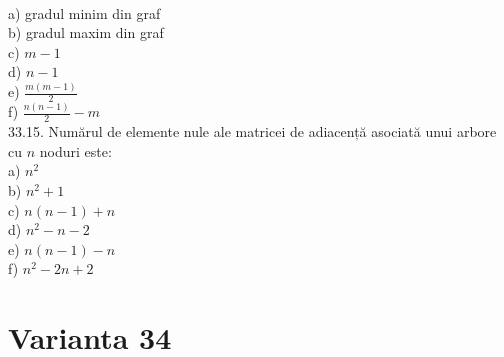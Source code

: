 \begin{itemize}
\begin{enumerate}
\\
a) gradul minim din graf
\\
b) gradul maxim din graf
\\
c) $m-1$
\\
d) $n-1$
\\
e) $\frac{m(m-1)}{2}$
\\
f) $\frac{n(n-1)}{2}-m$
\\
33.15. Numărul de elemente nule ale matricei de adiacență asociată unui arbore cu $n$ noduri este:\\
a) $n^{2}$
\\
b) $n^{2}+1$
\\
c) $n(n-1)+n$
\\
d) $n^{2}-n-2$
\\
e) $n(n-1)-n$
\\
f) $n^{2}-2 n+2$
\\

\section*{Varianta 34}


\end{enumerate}
\end{itemize}
